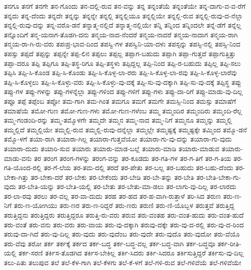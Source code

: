 {ತನಗೂ
ತನಗೆ
ತನಗೇ
ತನ-ಗೊಂದು
ತನ-ದಲ್ಲಿ-ರುವ
ತನ-ವನ್ನು
ತನ್ನ
ತನ್ನಂತೆಯೆ
ತನ್ನಂತೆಯೇ
ತನ್ನ-ದಾಗು-ವ-ವ-ರೆಗೆ
ತನ್ನದು
ತನ್ನ-ದೆಂದು
ತನ್ನದೇ
ತನ್ನನ್ನು
ತನ್ನನ್ನೇ
ತನ್ನಲ್ಲಿ
ತನ್ನಲ್ಲಿಯೂ
ತನ್ನಲ್ಲಿಯೇ
ತನ್ನಲ್ಲಿ-ರುವ
ತನ್ನಲ್ಲಿ-ರುವು-ದ-ನೆಲ್ಲಾ
ತನ್ನಲ್ಲಿ-ರುವು-ದನ್ನು
ತನ್ನ-ವರೊ-ಡನೆ
ತನ್ನಾತ್ಮ-ನಲ್ಲಿದೆ
ತನ್ನಾತ್ಮ-ನಲ್ಲಿಯೇ
ತನ್ನಿ
ತನ್ನಿಂದ
ತನ್ನಿಂದಲೇ
ತನ್ನೆ-ಡೆಗೆ
ತನ್ನೆಲ್ಲ
ತನ್ನೊಂದಿಗೆ
ತನ್ಮ-ಯನಾಗ-ತೊಡಗಿ-ದನು
ತನ್ಮಯ-ನಾದ-ನೆಂದರೆ
ತನ್ಮಯ-ನಾದರೆ
ತನ್ಮಯ-ನಾದಾಗ
ತನ್ಮಯ-ರಾಗಿ
ತನ್ಮಯ-ರಾ-ಗಿ-ರು-ವರು
ತಪಃಪ್ರ-ಭಾವ-ದಿಂದ
ತಪಸ್ವಿ-ಗಳ
ತಪಸ್ವಿನಿ-ಯಾ-ದಳು
ತಪಸ್ಸನ್ನು
ತಪಸ್ಸಿ-ನಲ್ಲಿ
ತಪಸ್ಸಿ-ನಿಂದ
ತಪಸ್ಸು
ತಪ್ಪದೆ
ತಪ್ಪನ್ನು
ತಪ್ಪನ್ನೇ
ತಪ್ಪ-ಲಿನ
ತಪ್ಪಲು
ತಪ್ಪಲ್ಲ
ತಪ್ಪಾಗ-ಬಹುದು
ತಪ್ಪಾಗಿ
ತಪ್ಪಾ-ಗುತ್ತದೆ
ತಪ್ಪಾಗುತ್ತಿತ್ತು
ತಪ್ಪಾ-ದರೂ
ತಪ್ಪಿ
ತಪ್ಪಿಗೂ
ತಪ್ಪಿ-ತಸ್ಥ-ರಿಗೂ
ತಪ್ಪಿ-ತಸ್ಥಳು
ತಪ್ಪಿದ್ದಲ್ಲ
ತಪ್ಪಿ-ನಿಂದ
ತಪ್ಪಿ-ರ-ಬಹುದು
ತಪ್ಪಿಲ್ಲ
ತಪ್ಪಿ-ಸಲು
ತಪ್ಪಿಸಿ
ತಪ್ಪಿ-ಸಿ-ಕೊಂಡ
ತಪ್ಪಿ-ಸಿ-ಕೊಂಡು
ತಪ್ಪಿ-ಸಿ-ಕೊಳ್ಳ-ಲಾ-ರರು
ತಪ್ಪಿ-ಸಿ-ಕೊಳ್ಳ-ಲಾ-ರವು
ತಪ್ಪಿ-ಸಿ-ಕೊಳ್ಳ-ಲಾರೆವು
ತಪ್ಪಿ-ಸಿ-ಕೊಳ್ಳಲು
ತಪ್ಪಿ-ಸಿ-ಕೊಳ್ಳು-ವರು
ತಪ್ಪಿ-ಸಿ-ಕೊಳ್ಳು-ವು-ದಕ್ಕೆ
ತಪ್ಪಿ-ಸು-ವು-ದಕ್ಕಾಗಿ
ತಪ್ಪಿ-ಸು-ವು-ದಕ್ಕೆ
ತಪ್ಪಿಸ್ಥ
ತಪ್ಪು
ತಪ್ಪು-ಗಳ
ತಪ್ಪು-ಗಳನ್ನು
ತಪ್ಪು-ಗಳನ್ನೆಲ್ಲಾ
ತಪ್ಪು-ಗಳಿಂದ
ತಪ್ಪು-ಗಳಿಗೆ
ತಪ್ಪು-ಗಳು
ತಪ್ಪು-ದಾ-ರಿಗೆ
ತಪ್ಪು-ಮಾಡು-ವು-ದಿಲ್ಲ
ತಪ್ಪೂ
ತಪ್ಪೆ
ತಪ್ಪೆಂಬ
ತಪ್ಪೋ
ತಮ-ಗಾಗಿ
ತಮ-ಗಿಂತ
ತಮಗೂ
ತಮಗೆ
ತಮಗೇ
ತಮಸ್ಸಿ-ನಿಂದ
ತಮಸ್ಸು
ತಮಾಷೆಗೆ
ತಮಾಷೆಯೆ
ತಮೋ-ಗುಣ
ತಮೋ-ಗುಣ-ಗಳು
ತಮೋ-ಗುಣ-ಗಳೆಂಬ
ತಮ್ಮ
ತಮ್ಮಂದಿರ
ತಮ್ಮಂದಿರು
ತಮ್ಮಂದಿ-ರೆಲ್ಲ
ತಮ್ಮ-ಗಂಡಂದಿ-ರನ್ನು
ತಮ್ಮ-ತಮ್ಮೊಳಗೇ
ತಮ್ಮದೇ
ತಮ್ಮನ
ತಮ್ಮ-ನಾದ
ತಮ್ಮ-ನಿಗೆ
ತಮ್ಮನೂ
ತಮ್ಮನ್ನು
ತಮ್ಮಲ್ಲಿ
ತಮ್ಮಲ್ಲಿದೆ
ತಮ್ಮಲ್ಲಿಯೇ
ತಮ್ಮಲ್ಲಿ-ರುವ
ತಮ್ಮಲ್ಲಿ-ರುವು-ದನ್ನೆಲ್ಲಾ
ತಮ್ಮಲ್ಲೇ
ತಮ್ಮಷ್ಟಕ್ಕೆ
ತಮ್ಮಷ್ಟಕ್ಕೇ
ತಮ್ಮಿಂದ
ತಮ್ಮೊ-ಡನೆ
ತಮ್ಮೊ-ಳಗೆ
ತಯಾ-ರಾಗಿ
ತಯಾರಾ-ಗಿಲ್ಲ
ತಯಾರಾ-ಗುತ್ತವೆಯೋ
ತಯಾರಾ-ಗು-ವು-ದನ್ನು
ತಯಾರಾ-ಗು-ವುದು
ತಯಾರಾ-ದುದು
ತಯಾರಿ-ಸುವ
ತಯಾರು
ತಯಾರು-ಮಾಡ-ಬಲ್ಲೆ
ತಯಾರು-ಮಾಡಿ
ತಯಾರು-ಮಾಡುವ
ತಯಾರು-ಮಾಡು-ವನು
ತರ
ತರಂಗ
ತರಂಗ-ಗಳನ್ನು
ತರಂಗ-ವನ್ನು
ತರ-ಕೂಡದು
ತರ-ಗತಿ-ಗಳ
ತರ-ಗ-ತಿಗೆ
ತರ-ಗ-ತಿಯ
ತರ-ಗತಿ-ಯೊಂದ-ರಲ್ಲಿ
ತರ-ಗೆ-ಲೆಯ
ತರ-ತಮ-ದಲ್ಲಿ
ತರದೆ
ತರ-ಪೇತು
ತರ-ಬಲ್ಲ
ತರ-ಬಹುದು
ತರ-ಬಹು-ದೆಂದು
ತರ-ಬೇಕಾ-ಗಿತ್ತು
ತರ-ಬೇಕಾ-ದರೆ
ತರ-ಬೇಕು
ತರ-ಬೇಕೆಂದು
ತರ-ಬೇಡಿ
ತರ-ಬೇ-ತನ್ನು
ತರ-ಬೇತಿ
ತರ-ಬೇತಿ-ಬೇಕಾ-ಗು-ವುದು
ತರ-ಬೇತಿ-ಯನ್ನು
ತರ-ಬೇತಿ-ಯಲ್ಲಿ
ತರ-ಬೇತು
ತರ-ಬೇತು-ಮಾ-ಡಲು
ತರ-ಲಾಗು-ವು-ದಿಲ್ಲ
ತರ-ಲಾರದು
ತರ-ಲಾ-ರವು
ತರಲು
ತರ-ವಲ್ಲ
ತರ-ವಾ-ದುದು
ತರಹ
ತರ-ಹದ
ತರ-ಹ-ವಾಗಿ-ರುತ್ತಾಳೆ
ತರಿ-ಸಿದ
ತರುಣ
ತರು-ಣ-ನಿಗೆ
ತರು-ಣ-ಯೋಗಿಯು
ತರು-ಣರ
ತರು-ಣ-ರಿದ್ದರೆ
ತರು-ಣರು
ತರುಣಿ
ತರು-ಣಿ-ಯೊಬ್ಬಳ
ತರುತ್ತವೆ
ತರುತ್ತಿದ್ದ
ತರುತ್ತಿದ್ದನು
ತರುತ್ತಿದ್ದರು
ತರುತ್ತಿದ್ದರೂ
ತರುತ್ತಿ-ರು-ವರು
ತರುವ
ತರು-ವಂತಹ
ತರು-ವಂತ-ಹುದು
ತರು-ವಂತ-ಹುದೆ
ತರು-ವಂತೆ
ತರು-ವನು
ತರು-ವರು
ತರು-ವಾಯ
ತರು-ವು-ದಕ್ಕಾಗಿ
ತರುವು-ದಕ್ಕೇ
ತರು-ವು-ದ-ರಲ್ಲಿ
ತರು-ವು-ದ-ರಿಂದ
ತರುವು-ದಾ-ಗಿದೆ
ತರು-ವು-ದಿಲ್ಲ
ತರು-ವುದು
ತರು-ವುದೆಂಬ
ತರು-ವುದೇ
ತರು-ವುದೊ
ತರು-ವುದೋ
ತರು-ವೆಯೊ
ತರು-ವೆವು
ತರೋ
ತರ್ಕ
ತರ್ಕಕ್ಕೆ
ತರ್ಕದ
ತರ್ಕ-ಬದ್ಧ
ತರ್ಕ-ಬದ್ಧ-ವಲ್ಲ
ತರ್ಕ-ಬದ್ಧ-ವಾಗಿ
ತರ್ಕ-ಬದ್ಧವೂ
ತರ್ಕ-ರೀತಿ-ಯಲ್ಲಿ
ತರ್ಕ-ಸರಣಿ
ತರ್ಕಿಸ-ತೊಡಗಿದ
ತರ್ಕಿಸ-ಬೇಕಿಲ್ಲ
ತರ್ಕಿ-ಸಿದರು
ತರ್ಕಿ-ಸಿದರೂ
ತರ್ಕಿಸುತ್ತಿದ್ದರೆ
ತರ್ಕಿಸು-ವು-ದಿಲ್ಲ
ತಲು-ಪಿತು
ತಲುಪುವ
ತಲೆ
ತಲೆ-ಕೆಳ-ಗಾಗಿ
ತಲೆ-ಕೆಳಗು
ತಲೆ-ಕೆ-ಳಗೆ
ತಲೆ-ಗಳಿ-ರುವ
ತಲೆ-ಗಳಿವೆಯೆ
ತಲೆ-ಗಳಿವೆಯೇ
}
